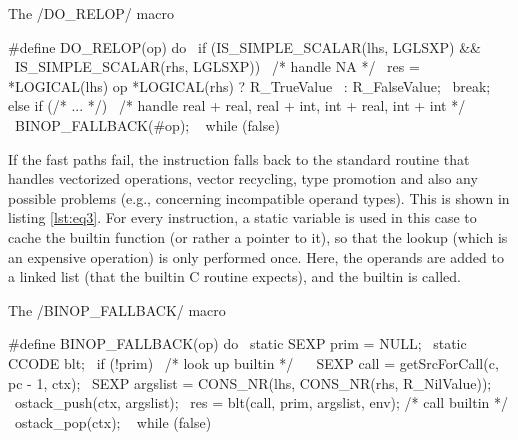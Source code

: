 \begin{listing}[htbp]
  \caption{\label{lst:eq2}The \cinline/DO_RELOP/ macro}
  \begin{ccode}
#define DO_RELOP(op) do {                                             \
    if (IS_SIMPLE_SCALAR(lhs, LGLSXP) &&                              \
        IS_SIMPLE_SCALAR(rhs, LGLSXP)) {                              \
        /* handle NA */                                               \
        res = *LOGICAL(lhs) op *LOGICAL(rhs) ? R_TrueValue            \
                                             : R_FalseValue;          \
        break;                                                        \
    } else if (/* ... */) {                                           \
        /* handle real + real, real + int, int + real, int + int */   \
    }                                                                 \
    BINOP_FALLBACK(#op);                                              \
} while (false)
  \end{ccode}
\end{listing}

If the fast paths fail, the instruction falls back to the standard routine that handles vectorized operations, vector recycling, type promotion and also any possible problems (e.g., concerning incompatible operand types). This is shown in listing \ref{lst:eq3}. For every instruction, a static variable is used in this case to cache the builtin function (or rather a pointer to it), so that the lookup (which is an expensive operation) is only performed once. Here, the operands are added to a linked list (that the builtin C routine expects), and the builtin is called.

\begin{listing}[htbp]
  \caption{\label{lst:eq3}The \cinline/BINOP_FALLBACK/ macro}
  \begin{ccode}
#define BINOP_FALLBACK(op) do {                                       \
    static SEXP prim = NULL;                                          \
    static CCODE blt;                                                 \
    if (!prim) {                                                      \
        /* look up builtin */                                         \
    }                                                                 \
    SEXP call = getSrcForCall(c, pc - 1, ctx);                        \
    SEXP argslist = CONS_NR(lhs, CONS_NR(rhs, R_NilValue));           \
    ostack_push(ctx, argslist);                                       \
    res = blt(call, prim, argslist, env);  /* call builtin */         \
    ostack_pop(ctx);                                                  \
} while (false)
  \end{ccode}
\end{listing}

